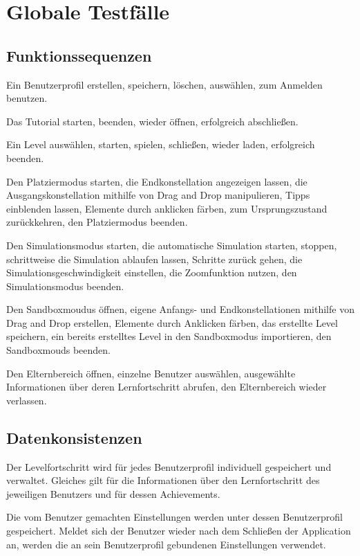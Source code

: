 \section{Globale Testfälle}

\subsection{Funktionssequenzen}

\begin{requirements}

   Ein Benutzerprofil erstellen, speichern, löschen, auswählen, zum Anmelden benutzen.
  	
   Das Tutorial starten, beenden, wieder öffnen, erfolgreich abschließen.
  	
   Ein Level auswählen, starten, spielen, schließen, wieder laden, erfolgreich beenden.
  	
   Den Platziermodus starten, die Endkonstellation angezeigen lassen, die Ausgangskonstellation mithilfe von Drag and Drop manipulieren, Tipps einblenden lassen, Elemente durch anklicken färben, zum Ursprungszustand zurückkehren, den Platziermodus beenden.
  
   Den Simulationsmodus starten, die automatische Simulation starten, stoppen, schrittweise die Simulation ablaufen lassen, Schritte zurück gehen, die Simulationsgeschwindigkeit einstellen, die Zoomfunktion nutzen, den Simulationsmodus beenden.
  	
   Den Sandboxmoudus öffnen, eigene Anfangs- und Endkonstellationen mithilfe von Drag and Drop erstellen, Elemente durch Anklicken färben, das erstellte Level speichern, ein bereits erstelltes Level in den Sandboxmodus importieren, den Sandboxmouds beenden.
  
   Den Elternbereich öffnen, einzelne Benutzer auswählen, ausgewählte Informationen über deren Lernfortschritt abrufen, den Elternbereich wieder verlassen.
  		
\end{requirements}
  		
\subsection{Datenkonsistenzen}

\begin{requirements}
  		
   Der Levelfortschritt wird für jedes Benutzerprofil individuell gespeichert und verwaltet. Gleiches gilt für die Informationen über den Lernfortschritt des jeweiligen Benutzers und für dessen Achievements.
  		
   Die vom Benutzer gemachten Einstellungen werden unter dessen Benutzerprofil gespeichert. Meldet sich der Benutzer wieder nach dem Schließen der Application an, werden die an sein Benutzerprofil gebundenen Einstellungen verwendet.

\end{requirements}	
